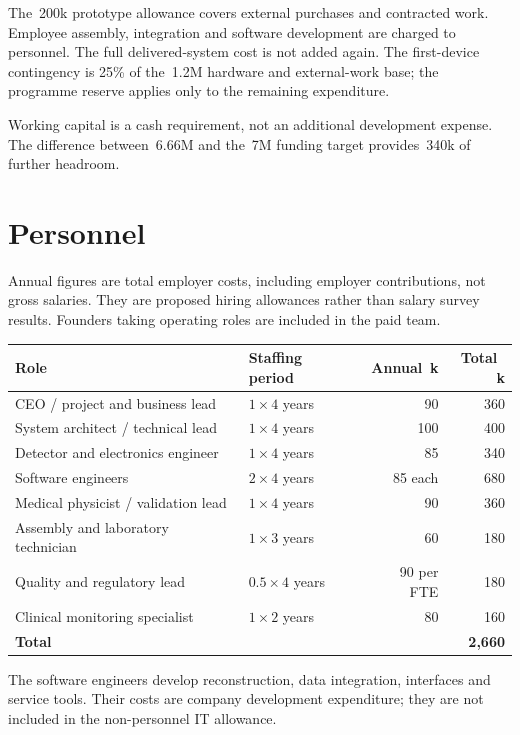 \documentclass[11pt,a4paper]{article}
\newcommand{\keur}{\EUR\,k}
\begin{document}
The \EUR\,200k prototype allowance covers external purchases and contracted
work. Employee assembly, integration and software development are charged to
personnel. The full delivered-system cost is not added again. The first-device
contingency is 25\% of the \EUR\,1.2M hardware and external-work base; the
programme reserve applies only to the remaining expenditure.

Working capital is a cash requirement, not an additional development expense.
The difference between \EUR\,6.66M and the \EUR\,7M funding target provides
\EUR\,340k of further headroom.

\section{Personnel}

Annual figures are total employer costs, including employer contributions,
not gross salaries. They are proposed hiring allowances rather than salary
survey results. Founders taking operating roles are included in the paid team.

\begin{table}[htbp]
\centering\small
\renewcommand{\arraystretch}{1.2}
\begin{tabularx}{\textwidth}{@{}Xlrr@{}}
\toprule
Role & Staffing period & Annual \keur & Total \keur \\
\midrule
CEO / project and business lead & $1\times4$ years & 90 & 360 \\
System architect / technical lead & $1\times4$ years & 100 & 400 \\
Detector and electronics engineer & $1\times4$ years & 85 & 340 \\
Software engineers & $2\times4$ years & 85 each & 680 \\
Medical physicist / validation lead & $1\times4$ years & 90 & 360 \\
Assembly and laboratory technician & $1\times3$ years & 60 & 180 \\
Quality and regulatory lead & $0.5\times4$ years & 90 per FTE & 180 \\
Clinical monitoring specialist & $1\times2$ years & 80 & 160 \\
\midrule
\textbf{Total} & & & \textbf{2,660} \\
\bottomrule
\end{tabularx}
\end{table}

The software engineers develop reconstruction, data integration, interfaces
and service tools. Their costs are company development expenditure; they are
not included in the non-personnel IT allowance.
\end{document}
